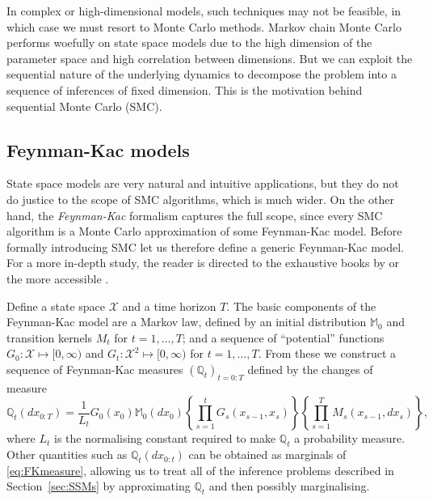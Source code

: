 In complex or high-dimensional models, such techniques may not be feasible, in which case we must resort to Monte Carlo methods.
Markov chain Monte Carlo performs woefully on state space models due to the high dimension of the parameter space and high correlation between dimensions. 
But we can exploit the sequential nature of the underlying dynamics to decompose the problem into a sequence of inferences of fixed dimension.
This is the motivation behind sequential Monte Carlo (SMC).


\subsection{Feynman-Kac models \seb{$\checkmark$} }

State space models are very natural and intuitive applications, but they do not do justice to the scope of SMC algorithms, which is much wider.
On the other hand, the \emph{Feynman-Kac} formalism captures the full scope, since every SMC algorithm is a Monte Carlo approximation of some Feynman-Kac model.
Before formally introducing SMC let us therefore define a generic Feynman-Kac model.
For a more in-depth study, the reader is directed to the exhaustive books by \textcite{delmoral2004, delmoral2013} or the more accessible \textcite[Chapter 5]{chopin2020}.

Define a state space $\mathcal{X}$ and a time horizon $T$.
The basic components of the Feynman-Kac model are a Markov law, defined by an initial distribution $\mathbb{M}_0$ and transition kernels $M_t$ for $t=1,\dots,T$; and a sequence of ``potential'' functions $G_0 : \mathcal{X} \mapsto [0,\infty)$  and $G_t : \mathcal{X}^2 \mapsto [0,\infty)$ for $t=1,\dots,T$.
From these we construct a sequence of Feynman-Kac measures $(\mathbb{Q}_t)_{t=0:T}$ defined by the changes of measure
\begin{equation}
\mathbb{Q}_t (dx_{0:T}) = \frac{1}{L_t} G_0(x_0) \mathbb{M}_0(dx_0)
        \left\{ \prod_{s=1}^t G_s(x_{s-1}, x_s) \right\} 
        \left\{ \prod_{s=1}^T M_s(x_{s-1}, dx_s) \right\} , \label{eq:FKmeasure}
\end{equation}
where $L_t$ is the normalising constant required to make $\mathbb{Q}_t$ a probability measure. Other quantities such as $\mathbb{Q}_t (dx_{0:t})$ can be obtained as marginals of \eqref{eq:FKmeasure}, allowing us to treat all of the inference problems described in Section~\ref{sec:SSMs} by approximating $\mathbb{Q}_t$ and then possibly marginalising.

